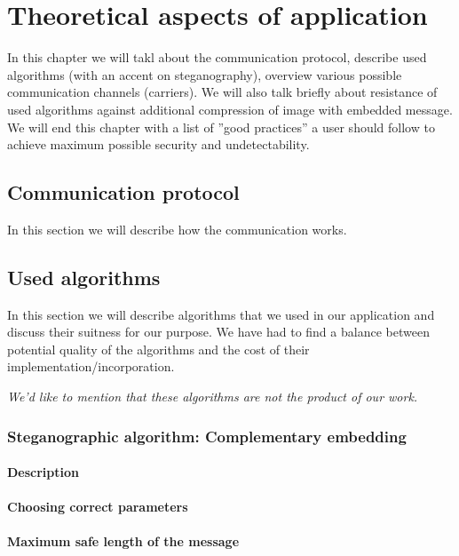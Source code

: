 \chapter{Theoretical aspects of application}
In this chapter we will takl about the communication protocol,
describe used algorithms (with an accent on steganography), 
overview various possible communication channels (carriers).
We will also talk briefly about resistance of used algorithms
against additional compression of image with embedded message.
We will end this chapter with a list of ''good practices''
a user should follow to achieve maximum possible security
and undetectability.


\section{Communication protocol}
In this section we will describe how the communication works.


\section{Used algorithms}
In this section we will describe algorithms that we used in our application
and discuss their suitness for our purpose. 
We have had to find a balance between potential quality of the algorithms 
and the cost of their implementation/incorporation.

\textit{We'd like to mention that these algorithms are not the product of our work.}

\subsection{Steganographic algorithm: Complementary embedding}

\subsubsection{Description}

\subsubsection{Choosing correct parameters}

\subsubsection{Maximum safe length of the message}

